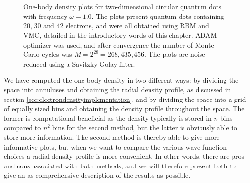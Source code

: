 \begin{figure}
	\centering
	\captionsetup[subfigure]{labelformat=empty}
	\hspace{0.1cm}
	\hspace{-0.0cm}
	\\
	
	\hspace{0.1cm}
	\hspace{-0.0cm}
	\\
	
	\hspace{0.1cm}
	\hspace{-0.0cm}
	
	\caption{One-body density plots for two-dimensional circular quantum dots with frequency $\omega=1.0$. The plots present quantum dots containing 20, 30 and 42 electrons, and were all obtained using RBM and VMC, detailed in the introductory words of this chapter. ADAM optimizer was used, and after convergence the number of Monte-Carlo cycles was $M=2^{28}=268,435,456$. The plots are noise-reduced using a Savitzky-Golay filter.}
	\label{fig:OB_interaction_1p0w2}
\end{figure}

We have computed the one-body density in two different ways: by dividing the space into annuluses and obtaining the radial density profile, as discussed in section \ref{sec:electrondensityimplementation}, and by dividing the space into a grid of equally sized bins and obtaining the density profile throughout the space. The former is computational beneficial as the density typically is stored in $n$ bins compared to $n^2$ bins for the second method, but the latter is obviously able to store more information. The second method is thereby able to give more informative plots, but when we want to compare the various wave function choices a radial density profile is more convenient. In other words, there are pros and cons associated with both methods, and we will therefore present both to give an as comprehensive description of the results as possible. 

